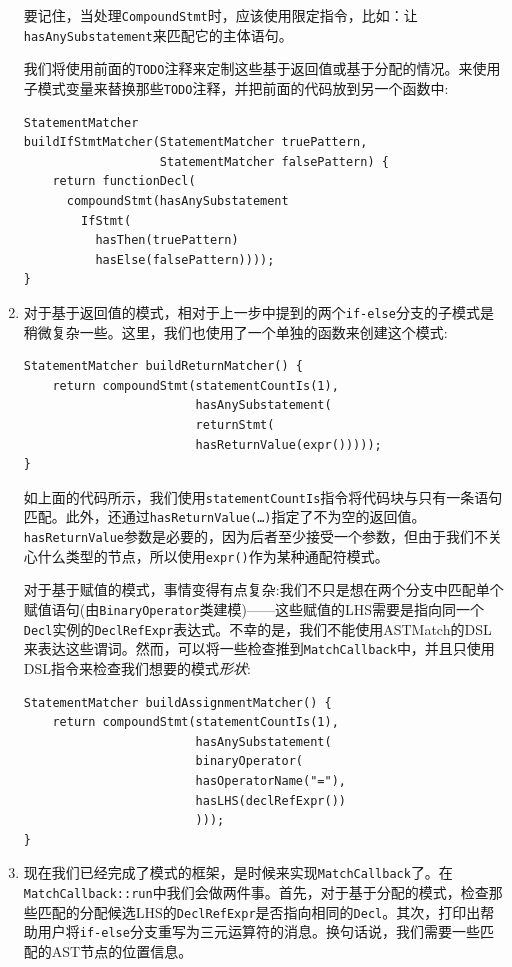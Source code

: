 \begin{enumerate}
要记住，当处理\texttt{CompoundStmt}时，应该使用限定指令，比如：让\texttt{hasAnySubstatement}来匹配它的主体语句。

我们将使用前面的\texttt{TODO}注释来定制这些基于返回值或基于分配的情况。来使用子模式变量来替换那些\texttt{TODO}注释，并把前面的代码放到另一个函数中:

\begin{lstlisting}[style=styleCXX]
StatementMatcher
buildIfStmtMatcher(StatementMatcher truePattern,
				   StatementMatcher falsePattern) {
	return functionDecl(
	  compoundStmt(hasAnySubstatement
  	    IfStmt(
		  hasThen(truePattern)
		  hasElse(falsePattern))));
}
\end{lstlisting}

\item 对于基于返回值的模式，相对于上一步中提到的两个\texttt{if-else}分支的子模式是稍微复杂一些。这里，我们也使用了一个单独的函数来创建这个模式:

\begin{lstlisting}[style=styleCXX]
StatementMatcher buildReturnMatcher() {
	return compoundStmt(statementCountIs(1),
						hasAnySubstatement(
						returnStmt(
						hasReturnValue(expr()))));
}
\end{lstlisting}

如上面的代码所示，我们使用\texttt{statementCountIs}指令将代码块与只有一条语句匹配。此外，还通过\texttt{hasReturnValue(…)}指定了不为空的返回值。\texttt{hasReturnValue}参数是必要的，因为后者至少接受一个参数，但由于我们不关心什么类型的节点，所以使用\texttt{expr()}作为某种通配符模式。

对于基于赋值的模式，事情变得有点复杂:我们不只是想在两个分支中匹配单个赋值语句(由\texttt{BinaryOperator}类建模)——这些赋值的LHS需要是指向同一个\texttt{Decl}实例的\texttt{DeclRefExpr}表达式。不幸的是，我们不能使用ASTMatch的DSL来表达这些谓词。然而，可以将一些检查推到\texttt{MatchCallback}中，并且只使用DSL指令来检查我们想要的模式\textit{形状}:

\begin{lstlisting}[style=styleCXX]
StatementMatcher buildAssignmentMatcher() {
	return compoundStmt(statementCountIs(1),
						hasAnySubstatement(
						binaryOperator(
						hasOperatorName("="),
						hasLHS(declRefExpr())
						)));
}
\end{lstlisting}

\item 现在我们已经完成了模式的框架，是时候来实现\texttt{MatchCallback}了。在\texttt{MatchCallback::run}中我们会做两件事。首先，对于基于分配的模式，检查那些匹配的分配候选LHS的\texttt{DeclRefExpr}是否指向相同的\texttt{Decl}。其次，打印出帮助用户将\texttt{if-else}分支重写为三元运算符的消息。换句话说，我们需要一些匹配的AST节点的位置信息。


\end{enumerate}
